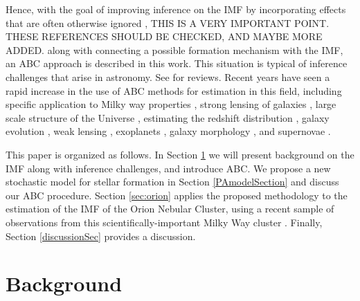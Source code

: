 \documentclass[12pt]{article}
\begin{document}
Hence, with the goal of improving inference on the IMF by incorporating effects that are 
often otherwise ignored \citep{Kalari2018, Ashworth2017, Jose2017},{\color{red} THIS IS A
VERY IMPORTANT POINT. THESE REFERENCES SHOULD BE CHECKED, AND MAYBE MORE ADDED.}
along with connecting a possible formation 
mechanism with the IMF, an ABC approach is described in this work.
This situation is typical of inference challenges that arise in astronomy. See
\cite{schafer2012, AkeretEtAl2015, IshidaEtAl2015} for reviews.
Recent years have seen a
rapid increase in the use of ABC methods for estimation in this field, including
specific application to 
Milky way properties \citep{RobinEtAl2014},
strong lensing of galaxies \citep{Killedar2018,Birrer2017},
large scale structure of the Universe \citep{Hahn2017b},
estimating the redshift distribution \citep{Herbel2017},
galaxy evolution \citep{Hahn2017a},
weak lensing \citep{Peel2017,Lin2015},
exoplanets \citep{Parker2015},
galaxy morphology \citep{CameronPettitt2012},
and
supernovae \citep{WeyantEtAl2013}.

%

This paper is organized as follows. In Section \ref{sec:background} we will present background on the IMF along with inference challenges, and introduce ABC. We propose a new stochastic model for stellar formation in Section \ref{PAmodelSection} and discuss our ABC procedure. 
Section \ref{sec:orion} applies the proposed methodology to the estimation of the IMF of the
Orion Nebular Cluster,
using a recent sample of observations from this scientifically-important Milky Way cluster \citep{Hillenbrand1998,DaRioEtAl2012}.
Finally, Section \ref{discussionSec} provides a discussion.



\section{Background}
\label{sec:background}
\end{document}
